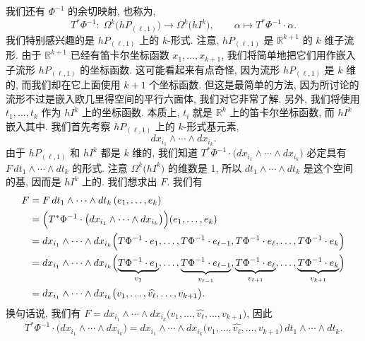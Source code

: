 我们还有 $\Phi^{-1}$ 的余切映射, 也称为, 
\[
T^*\Phi^{-1}:\;\Omega^k\bigl(hP_{(\ell,1)}\bigr)\longrightarrow\Omega^k\bigl(hI^k\bigr),\qquad
\alpha\longmapsto T^*\Phi^{-1}\cdot\alpha.
\]
我们特别感兴趣的是 $hP_{(\ell,1)}$ 上的 $k$-形式. 注意, $hP_{(\ell,1)}$ 是 $\mathbb{R}^{k+1}$ 的 $k$ 维子流形. 由于 $\mathbb{R}^{k+1}$ 已经有笛卡尔坐标函数 $x_1,\ldots,x_{k+1}$, 我们将简单地把它们用作嵌入子流形 $hP_{(\ell,1)}$ 的坐标函数. 这可能看起来有点奇怪, 因为流形 $hP_{(\ell,1)}$ 是 $k$ 维的, 而我们却在它上面使用 $k+1$ 个坐标函数. 但这是最简单的方法, 因为所讨论的流形不过是嵌入欧几里得空间的平行六面体, 我们对它非常了解. 另外, 我们将使用 $t_1,\ldots,t_k$ 作为 $hI^k$ 上的坐标函数. 本质上, $t_i$ 就是 $\mathbb{R}^k$ 上的笛卡尔坐标函数, 而 $hI^k$ 嵌入其中. 我们首先考察 $hP_{(\ell,1)}$ 上的 $k$-形式基元素, 
\[
dx_{i_1}\wedge\cdots\wedge dx_{i_k}.
\]
由于 $hP_{(\ell,1)}$ 和 $hI^k$ 都是 $k$ 维的, 我们知道 $T^*\Phi^{-1}\cdot\bigl(dx_{i_1}\wedge\cdots\wedge dx_{i_k}\bigr)$ 必定具有 $F\,dt_1\wedge\cdots\wedge dt_k$ 的形式. 注意 $\Omega^k\bigl(hI^k\bigr)$ 的维数是 1, 所以 $dt_1\wedge\cdots\wedge dt_k$ 是这个空间的基, 因而是 $hI^k$ 上的. 我们想求出 $F$. 我们有
\begin{align*}
F&=F\,dt_1\wedge\cdots\wedge dt_k\,(e_1,\ldots,e_k)\\
&=\Bigl(T^*\Phi^{-1}\cdot\bigl(dx_{i_1}\wedge\cdots\wedge dx_{i_k}\bigr)\Bigr)(e_1,\ldots,e_k)\\
&=dx_{i_1}\wedge\cdots\wedge dx_{i_k}\Bigl(T\Phi^{-1}\cdot e_1,\ldots,T\Phi^{-1}\cdot e_{\ell-1},
T\Phi^{-1}\cdot e_\ell,\ldots,T\Phi^{-1}\cdot e_k\Bigr)\\
&=dx_{i_1}\wedge\cdots\wedge dx_{i_k}\Bigl(\underbrace{T\Phi^{-1}\cdot e_1}_{v_1},\ldots,
\underbrace{T\Phi^{-1}\cdot e_{\ell-1}}_{v_{\ell-1}},
\underbrace{T\Phi^{-1}\cdot e_\ell}_{v_{\ell+1}},\ldots,
\underbrace{T\Phi^{-1}\cdot e_k}_{v_{k+1}}\Bigr)\\
&=dx_{i_1}\wedge\cdots\wedge dx_{i_k}\bigl(v_1,\ldots,\widehat{v_\ell},\ldots,v_{k+1}\bigr).
\end{align*}
换句话说, 我们有 $F=dx_{i_1}\wedge\cdots\wedge dx_{i_k}\bigl(v_1,\ldots,\widehat{v_\ell},\ldots,v_{k+1}\bigr)$, 因此
\[
T^*\Phi^{-1}\cdot\bigl(dx_{i_1}\wedge\cdots\wedge dx_{i_k}\bigr)
=dx_{i_1}\wedge\cdots\wedge dx_{i_k}\bigl(v_1,\ldots,\widehat{v_\ell},\ldots,v_{k+1}\bigr)\,dt_1\wedge\cdots\wedge dt_k.
\]

